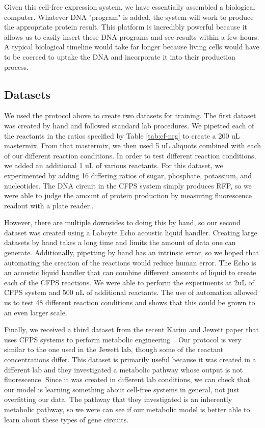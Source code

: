 Given this cell-free expression system, we have essentially assembled a biological computer.
Whatever DNA "program" is added, the system will work to produce the appropriate protein result.
This platform is incredibly powerful because it allows us to easily insert these DNA programs and see results within a few hours.
A typical biological timeline would take far longer because living cells would have to be coerced to uptake the DNA and incorporate it into their production process.


\subsection{Datasets}
We used the protocol above to create two datasets for training.
The first dataset was created by hand and followed standard lab procedures.
We pipetted each of the reactants in the ratios specified by Table \ref{tab:cf-nrg} to create a 200 uL mastermix. 
From that mastermix, we then used 5 uL aliquots combined with each of our different reaction conditions.
In order to test different reaction conditions, we added an additional 1 uL of various reactants.
For this dataset, we experimented by adding 16 differing ratios of sugar, phosphate, potassium, and nucleotides.
The DNA circuit in the CFPS system simply produces RFP, so we were able to judge the amount of protein production by measuring fluorescence readout with a plate reader..

However, there are multiple downsides to doing this by hand, so our second dataset was created using a Labcyte Echo acoustic liquid handler.
Creating large datasets by hand takes a long time and limits the amount of data one can generate.
Additionally, pipetting by hand has an intrinsic error, so we hoped that automating the creation of the reactions would reduce human error.
The Echo is an acoustic liquid handler that can combine different amounts of liquid to create each of the CFPS reactions.
We were able to perform the experiments at 2uL of CFPS system and 500 nL of additional reactants.
The use of automation allowed us to test 48 different reaction conditions and shows that this could be grown to an even larger scale.

Finally, we received a third dataset from the recent Karim and Jewett paper that uses CFPS systems to perform metabolic engineering~\cite{karim2018controlling}.
Our protocol is very similar to the one used in the Jewett lab, though some of the reactant concentrations differ.
This dataset is primarily useful because it was created in a different lab and they investigated a metabolic pathway whose output is not fluorescence.
Since it was created in different lab conditions, we can check that our model is learning something about cell-free systems in general, not just overfitting our data.
The pathway that they investigated is an inherently metabolic pathway, so we were can see if our metabolic model is better able to learn about these types of gene circuits.

